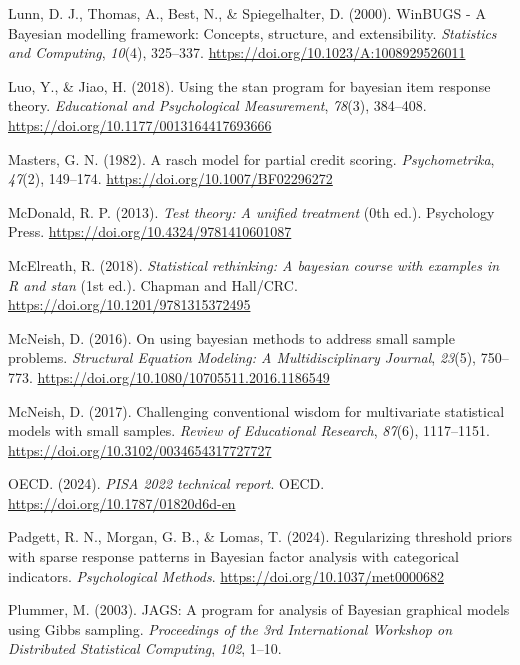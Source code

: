 \documentclass[
  man,
  floatsintext,
  longtable,
  nolmodern,
  notxfonts,
  notimes,
  colorlinks=true,linkcolor=blue,citecolor=blue,urlcolor=blue]{apa7}
\newlength{\cslhangindent}
\newenvironment{CSLReferences}[2] %
 {\begin{list}{}{%
  \setlength{\itemindent}{0pt}
  \setlength{\leftmargin}{0pt}
  \setlength{\parsep}{0pt}
  \ifodd #1
   \setlength{\leftmargin}{\cslhangindent}
   \setlength{\itemindent}{-1\cslhangindent}
  \fi
  \setlength{\itemsep}{#2\baselineskip}}}
 {\end{list}}
\begin{document}
\begin{CSLReferences}{1}{0}
Lunn, D. J., Thomas, A., Best, N., \& Spiegelhalter, D. (2000).
{WinBUGS} - {A Bayesian} modelling framework: {Concepts}, structure, and
extensibility. \emph{Statistics and Computing}, \emph{10}(4), 325--337.
\url{https://doi.org/10.1023/A:1008929526011}

Luo, Y., \& Jiao, H. (2018). Using the stan program for bayesian item
response theory. \emph{Educational and Psychological Measurement},
\emph{78}(3), 384--408. \url{https://doi.org/10.1177/0013164417693666}

Masters, G. N. (1982). A rasch model for partial credit scoring.
\emph{Psychometrika}, \emph{47}(2), 149--174.
\url{https://doi.org/10.1007/BF02296272}

McDonald, R. P. (2013). \emph{Test theory: A unified treatment} (0th
ed.). Psychology Press. \url{https://doi.org/10.4324/9781410601087}

McElreath, R. (2018). \emph{Statistical rethinking: {A} bayesian course
with examples in {R} and stan} (1st ed.). {Chapman and Hall/CRC}.
\url{https://doi.org/10.1201/9781315372495}

McNeish, D. (2016). On using bayesian methods to address small sample
problems. \emph{Structural Equation Modeling: A Multidisciplinary
Journal}, \emph{23}(5), 750--773.
\url{https://doi.org/10.1080/10705511.2016.1186549}

McNeish, D. (2017). Challenging conventional wisdom for multivariate
statistical models with small samples. \emph{Review of Educational
Research}, \emph{87}(6), 1117--1151.
\url{https://doi.org/10.3102/0034654317727727}

OECD. (2024). \emph{{PISA} 2022 technical report}. OECD.
\url{https://doi.org/10.1787/01820d6d-en}

Padgett, R. N., Morgan, G. B., \& Lomas, T. (2024). Regularizing
threshold priors with sparse response patterns in {Bayesian} factor
analysis with categorical indicators. \emph{Psychological Methods}.
\url{https://doi.org/10.1037/met0000682}

Plummer, M. (2003). {JAGS}: {A} program for analysis of {Bayesian}
graphical models using {Gibbs} sampling. \emph{Proceedings of the 3rd
International Workshop on Distributed Statistical Computing},
\emph{102}, 1--10.


\end{CSLReferences}
\end{document}
